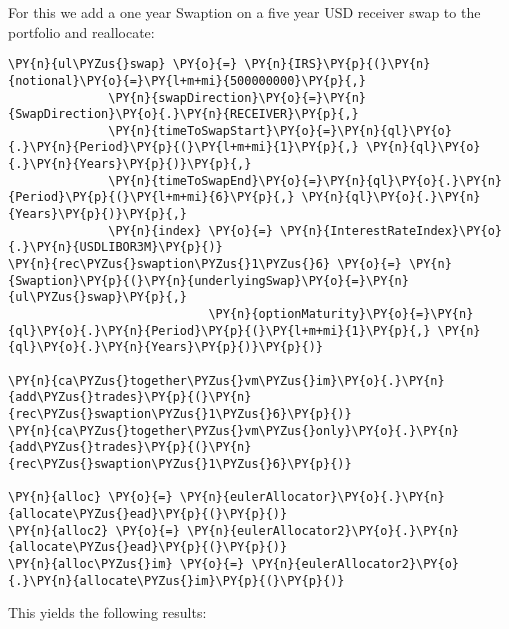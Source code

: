 For this we add a one year Swaption on a five year USD receiver swap to
the portfolio and reallocate:

    \begin{tcolorbox}[breakable, size=fbox, boxrule=1pt, pad at break*=1mm,colback=cellbackground, colframe=cellborder]
\begin{Verbatim}[commandchars=\\\{\}]
\PY{n}{ul\PYZus{}swap} \PY{o}{=} \PY{n}{IRS}\PY{p}{(}\PY{n}{notional}\PY{o}{=}\PY{l+m+mi}{500000000}\PY{p}{,}
              \PY{n}{swapDirection}\PY{o}{=}\PY{n}{SwapDirection}\PY{o}{.}\PY{n}{RECEIVER}\PY{p}{,}
              \PY{n}{timeToSwapStart}\PY{o}{=}\PY{n}{ql}\PY{o}{.}\PY{n}{Period}\PY{p}{(}\PY{l+m+mi}{1}\PY{p}{,} \PY{n}{ql}\PY{o}{.}\PY{n}{Years}\PY{p}{)}\PY{p}{,}
              \PY{n}{timeToSwapEnd}\PY{o}{=}\PY{n}{ql}\PY{o}{.}\PY{n}{Period}\PY{p}{(}\PY{l+m+mi}{6}\PY{p}{,} \PY{n}{ql}\PY{o}{.}\PY{n}{Years}\PY{p}{)}\PY{p}{,}
              \PY{n}{index} \PY{o}{=} \PY{n}{InterestRateIndex}\PY{o}{.}\PY{n}{USDLIBOR3M}\PY{p}{)}
\PY{n}{rec\PYZus{}swaption\PYZus{}1\PYZus{}6} \PY{o}{=} \PY{n}{Swaption}\PY{p}{(}\PY{n}{underlyingSwap}\PY{o}{=}\PY{n}{ul\PYZus{}swap}\PY{p}{,}
                            \PY{n}{optionMaturity}\PY{o}{=}\PY{n}{ql}\PY{o}{.}\PY{n}{Period}\PY{p}{(}\PY{l+m+mi}{1}\PY{p}{,} \PY{n}{ql}\PY{o}{.}\PY{n}{Years}\PY{p}{)}\PY{p}{)}

\PY{n}{ca\PYZus{}together\PYZus{}vm\PYZus{}im}\PY{o}{.}\PY{n}{add\PYZus{}trades}\PY{p}{(}\PY{n}{rec\PYZus{}swaption\PYZus{}1\PYZus{}6}\PY{p}{)}
\PY{n}{ca\PYZus{}together\PYZus{}vm\PYZus{}only}\PY{o}{.}\PY{n}{add\PYZus{}trades}\PY{p}{(}\PY{n}{rec\PYZus{}swaption\PYZus{}1\PYZus{}6}\PY{p}{)}

\PY{n}{alloc} \PY{o}{=} \PY{n}{eulerAllocator}\PY{o}{.}\PY{n}{allocate\PYZus{}ead}\PY{p}{(}\PY{p}{)}
\PY{n}{alloc2} \PY{o}{=} \PY{n}{eulerAllocator2}\PY{o}{.}\PY{n}{allocate\PYZus{}ead}\PY{p}{(}\PY{p}{)}
\PY{n}{alloc\PYZus{}im} \PY{o}{=} \PY{n}{eulerAllocator2}\PY{o}{.}\PY{n}{allocate\PYZus{}im}\PY{p}{(}\PY{p}{)}
\end{Verbatim}
\end{tcolorbox}

    This yields the following results:

